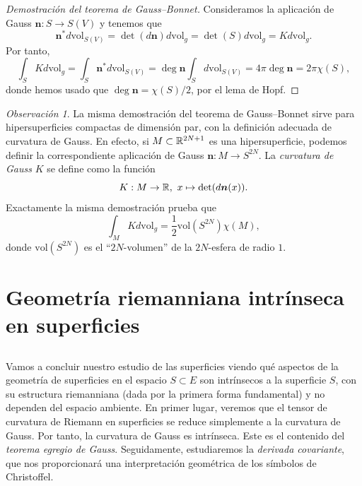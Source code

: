 \documentclass[11pt,a4paper]{amsbook}
\theoremstyle{remark} \newtheorem{rmk}[subsection]{Observación}
\theoremstyle{definition} \newtheorem{defn}[subsection]{Definición}
\theoremstyle{definition} \newtheorem{ex}[subsection]{Ejemplo}
\theoremstyle{definition} \newtheorem{ej}[subsection]{Ejercicio}
\begin{document}
\begin{proof}[Demostración del teorema de Gauss--Bonnet]
  Consideramos la aplicación de Gauss $\bm{n}:S\rightarrow S(V)$ y tenemos que
  \begin{equation*}
\bm{n}^* d\mathrm{vol}_{S(V)} = \det(d\bm{n}) d\mathrm{vol}_g = \det(S) d\mathrm{vol}_g = Kd\mathrm{vol}_g.
  \end{equation*}
  Por tanto,
  \begin{equation*}
\int_S K d\mathrm{vol}_g =\int_S \bm{n}^* d\mathrm{vol}_{S(V)} = \deg \bm{n} \int_S d\mathrm{vol}_{S(V)}=4\pi \deg \bm{n} = 2\pi\chi(S),
  \end{equation*}
donde hemos usado que $\deg \bm{n} = \chi(S)/2$, por el lema de Hopf.
\end{proof}

\begin{rmk}
La misma demostración del teorema de Gauss--Bonnet sirve para hipersuperficies compactas de dimensión par, con la definición adecuada de curvatura de Gauss. En efecto, si $M\subset \mathbb R^{2N+1}$ es una hipersuperficie, podemos definir la correspondiente aplicación de Gauss $\bm{n}:M\rightarrow S^{2N}$. La \emph{curvatura de Gauss} $K$ se define como la función
\begin{equation*}
K: M \rightarrow \mathbb R, \ x \mapsto \det(d\bm{n}(x)).
\end{equation*}
Exactamente la misma demostración prueba que
\begin{equation*}
\int_MK d\mathrm{vol}_g = \frac{1}{2} \mathrm{vol}(S^{2N}) \chi(M),
\end{equation*}
donde $\mathrm{vol}(S^{2N})$ es el ``$2N$-volumen'' de la $2N$-esfera de radio $1$.
\end{rmk}


\section{Geometría riemanniana intrínseca en superficies}
\subsection{} Vamos a concluir nuestro estudio de las superficies viendo qué aspectos de la geometría de superficies en el espacio $S\subset E$ son intrínsecos a la superficie $S$, con su estructura riemanniana (dada por la primera forma fundamental) y no dependen del espacio ambiente. En primer lugar, veremos que el tensor de curvatura de Riemann en superficies se reduce simplemente a la curvatura de Gauss. Por tanto, la curvatura de Gauss es intrínseca. Este es el contenido del \emph{teorema egregio de Gauss}. Seguidamente, estudiaremos la \emph{derivada covariante}, que nos proporcionará una interpretación geométrica de los símbolos de Christoffel.
\end{document}
